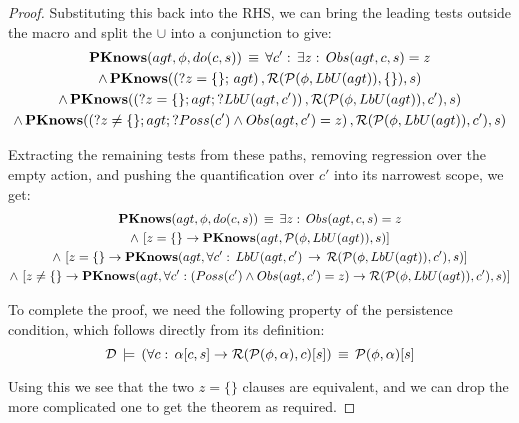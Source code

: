 \begin{proof}
Substituting this back into the RHS, we can bring the leading tests
outside the macro and split the $\cup$ into a conjunction to give:\begin{multline*}
\mathbf{PKnows}(agt,\phi,do(c,s))\,\equiv\,\forall c':\,\exists z:\, Obs(agt,c,s)=z\\
\wedge\,\mathbf{PKnows}(\left(?z=\{\};\, agt\right),\mathcal{R}(\mathcal{P}(\phi,LbU(agt)),\{\}),s)\\
\wedge\,\mathbf{PKnows}(\left(?z=\{\};agt;?LbU(agt,c')\right),\mathcal{R}(\mathcal{P}(\phi,LbU(agt)),c'),s)\\
\wedge\,\mathbf{PKnows}(\left(?z\neq\{\};agt;?Poss(c')\wedge Obs(agt,c')=z\right),\mathcal{R}(\mathcal{P}(\phi,LbU(agt)),c'),s)\end{multline*}


Extracting the remaining tests from these paths, removing regression
over the empty action, and pushing the quantification over $c'$ into
its narrowest scope, we get:\begin{multline*}
\mathbf{PKnows}(agt,\phi,do(c,s))\,\equiv\,\exists z:\, Obs(agt,c,s)=z\\
\wedge\,\left[z=\{\}\rightarrow\mathbf{PKnows}(agt,\mathcal{P}(\phi,LbU(agt)),s)\right]\\
\wedge\,\left[z=\{\}\rightarrow\mathbf{PKnows}(agt,\forall c':\, LbU(agt,c')\,\rightarrow\,\mathcal{R}(\mathcal{P}(\phi,LbU(agt)),c'),s)\right]\\
\wedge\,\left[z\neq\{\}\rightarrow\mathbf{PKnows}(agt,\forall c':\left(Poss(c')\wedge Obs(agt,c')=z\right)\rightarrow\mathcal{R}(\mathcal{P}(\phi,LbU(agt)),c'),s)\right]\end{multline*}


To complete the proof, we need the following property of the persistence
condition, which follows directly from its definition:\[
\mathcal{D}\,\models\,\left(\forall c:\,\alpha[c,s]\rightarrow\mathcal{R}(\mathcal{P}(\phi,\alpha),c)[s]\right)\,\equiv\,\mathcal{P}(\phi,\alpha)[s]\]


Using this we see that the two $z=\{\}$ clauses are equivalent, and
we can drop the more complicated one to get the theorem as required. 
\end{proof}
\medskip{}


